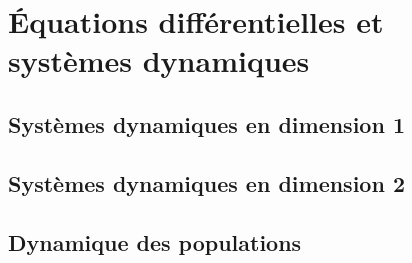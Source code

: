 \section{\'Equations différentielles et systèmes dynamiques} 
\newcommand{\equadiff}{/home/robin/ENSEIGN/Cours/MathBiologie/L3-ENS-Math1/Exercices/EquaDiff}

\subsection{Systèmes dynamiques en dimension 1}



\subsection{Systèmes dynamiques en dimension 2}



\subsection{Dynamique des populations}


